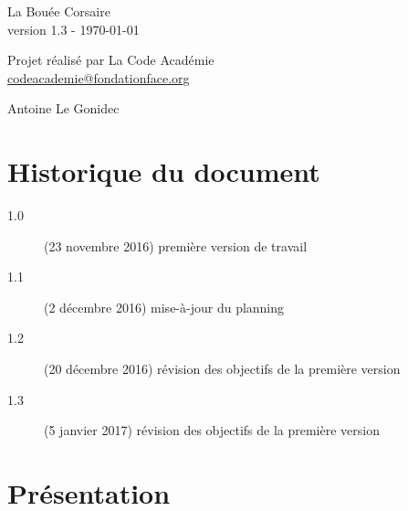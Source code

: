 \documentclass[french,12pt]{article}
\begin{document}
	
	\begin{titlepage}
		\begin{center}
			
			\vspace*{\fill}
			
			{\Huge
				La Bouée Corsaire
			}\\ [0.5cm]
			{\large
				version 1.3 - \today
			}\\
			
			\vspace*{\fill}
			
			{\Large
				Projet réalisé par La Code Académie
			}\\ [0.5cm]
			{\large
				\href{mailto:codeacademie@fondationface.org}{
					codeacademie@fondationface.org
				}
			}\\
			
			\vspace*{\fill}
			
			{\Large
				Antoine Le Gonidec
			}
			
			\vspace*{\fill}
			
		\end{center}
	\end{titlepage}
	
	\newpage
	\tableofcontents
	
	\newpage
	\section{Historique du document}
	\begin{description}
		\item [1.0] (23 novembre 2016) première version de travail
		\item [1.1] (2 décembre 2016) mise-à-jour du planning
		\item [1.2] (20 décembre 2016) révision des objectifs de la première version
		\item [1.3] (5 janvier 2017) révision des objectifs de la première version
	\end{description}
	
	\newpage
	\section{Présentation}
\end{document}
